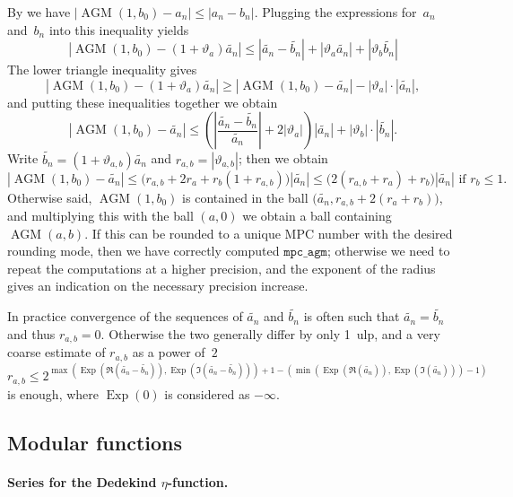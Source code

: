 \documentclass [11pt]{article}
\newcommand {\appro}[1]{\widetilde {#1}}
\newcommand {\ulp}[1]{#1~ulp}
\DeclareMathOperator{\Exp}{\operatorname {Exp}}
\renewcommand {\theta}{\vartheta}
\renewcommand {\leq}{\leqslant}
\renewcommand {\geq}{\geqslant}
\newcommand {\AGM}{\operatorname{AGM}}
\begin{document}
By \cite [p.87]{Dupont06} we have $|\AGM (1, b_0) - a_n| \leq |a_n - b_n|$.
Plugging the expressions for~$a_n$ and~$b_n$ into this inequality yields
\[
|\AGM (1, b_0) - (1 + \theta_a) \appro {a_n}|
\leq |\appro {a_n} - \appro {b_n}| + |\theta_a \appro {a_n}|
   + |\theta_b \appro {b_n}|
\]
The lower triangle inequality gives
\[
|\AGM (1, b_0) - (1 + \theta_a) \appro {a_n}|
\geq |\AGM (1, b_0) - \appro {a_n}| - |\theta_a| \cdot |\appro {a_n}|,
\]
and putting these inequalities together we obtain
\[
|\AGM (1, b_0) - \appro {a_n}|
\leq
\left( \left| \frac {\appro {a_n} - \appro {b_n}}{\appro {a_n}} \right|
   + 2 |\theta_a| \right) |\appro {a_n}|
   + |\theta_b| \cdot |\appro {b_n}|.
\]
Write $\appro {b_n} = (1 + \theta_{a,b}) \appro {a_n}$
and $r_{a, b} = |\theta_{a,b}|$; then we obtain
\[
|\AGM (1, b_0) - \appro {a_n}|
\leq
\big( r_{a, b} + 2 r_a + r_b (1 + r_{a, b}) \big) |\appro {a_n}|
\leq
\big( 2 (r_{a, b} + r_a) + r_b \big) |\appro {a_n}|
\text { if } r_b \leq 1.
\]
Otherwise said, $\AGM (1, b_0)$ is contained in the ball
$\big( \appro {a_n}, r_{a, b} + 2 (r_a + r_b) \big)$, and multiplying
this with the ball $(a, 0)$ we obtain a ball containing $\AGM (a, b)$.
If this can be rounded to a unique MPC number with the desired rounding
mode, then we have correctly computed $\texttt {mpc\_agm}$; otherwise we
need to repeat the computations at a higher precision, and the exponent
of the radius gives an indication on the necessary precision increase.

In practice convergence of the sequences of $\appro {a_n}$ and
$\appro {b_n}$ is often such that $\appro {a_n} = \appro {b_n}$ and thus
$r_{a, b} = 0$.
Otherwise the two generally differ by only \ulp {1}, and a very coarse
estimate of $r_{a,b}$ as a power of~$2$
\[
r_{a, b} \leq
2^{\max \left( \Exp (\Re (\appro {a_n} - \appro {b_n})),
               \Exp (\Im (\appro {a_n} - \appro {b_n})) \right) + 1
   - \left( \min \left( \Exp (\Re (\appro {a_n})), \Exp (\Im (\appro {a_n}))
                 \right)
            - 1 \right)}
\]
is enough, where $\Exp (0)$ is considered as $- \infty$.



\subsection {Modular functions}

\paragraph {Series for the Dedekind $\eta$-function.}
\end{document}
